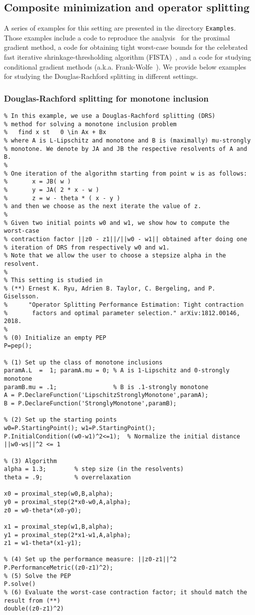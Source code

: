 \documentclass[11pt,a4paper]{article}
\begin{document}
\subsection{Composite minimization and operator splitting}
A series of examples for this setting are presented in the directory \verb|Examples|. Those examples include a code to reproduce the analysis~\cite{taylor2018exact} for the proximal gradient method, a code for obtaining tight worst-case bounds for the celebrated fast iterative shrinkage-thresholding algorithm (FISTA)~\cite{beck2009fast}, and a code for studying conditional gradient methods (a.k.a. Frank-Wolfe~\cite{frank1956algorithm}). We provide below examples for studying the Douglas-Rachford splitting in different settings.
\subsubsection{Douglas-Rachford splitting for monotone inclusion}
\begin{lstlisting}
% In this example, we use a Douglas-Rachford splitting (DRS) 
% method for solving a monotone inclusion problem
%   find x st   0 \in Ax + Bx 
% where A is L-Lipschitz and monotone and B is (maximally) mu-strongly
% monotone. We denote by JA and JB the respective resolvents of A and B.
%
% One iteration of the algorithm starting from point w is as follows:
%       x = JB( w )
%       y = JA( 2 * x - w )
%       z = w - theta * ( x - y )
% and then we choose as the next iterate the value of z.
%
% Given two initial points w0 and w1, we show how to compute the worst-case
% contraction factor ||z0 - z1||/||w0 - w1|| obtained after doing one
% iteration of DRS from respectively w0 and w1.
% Note that we allow the user to choose a stepsize alpha in the resolvent.
%
% This setting is studied in
% (**) Ernest K. Ryu, Adrien B. Taylor, C. Bergeling, and P. Giselsson.
%      "Operator Splitting Performance Estimation: Tight contraction
%       factors and optimal parameter selection." arXiv:1812.00146, 2018.
%
% (0) Initialize an empty PEP
P=pep();

% (1) Set up the class of monotone inclusions
paramA.L  =  1; paramA.mu = 0; % A is 1-Lipschitz and 0-strongly monotone
paramB.mu = .1;                % B is .1-strongly monotone
A = P.DeclareFunction('LipschitzStronglyMonotone',paramA);
B = P.DeclareFunction('StronglyMonotone',paramB);

% (2) Set up the starting points
w0=P.StartingPoint(); w1=P.StartingPoint();
P.InitialCondition((w0-w1)^2<=1);  % Normalize the initial distance ||w0-ws||^2 <= 1

% (3) Algorithm
alpha = 1.3;		% step size (in the resolvents)
theta = .9;         % overrelaxation

x0 = proximal_step(w0,B,alpha);
y0 = proximal_step(2*x0-w0,A,alpha);
z0 = w0-theta*(x0-y0);

x1 = proximal_step(w1,B,alpha);
y1 = proximal_step(2*x1-w1,A,alpha);
z1 = w1-theta*(x1-y1);

% (4) Set up the performance measure: ||z0-z1||^2
P.PerformanceMetric((z0-z1)^2);
% (5) Solve the PEP
P.solve()
% (6) Evaluate the worst-case contraction factor; it should match the result from (**)
double((z0-z1)^2)
\end{lstlisting}
\end{document}
